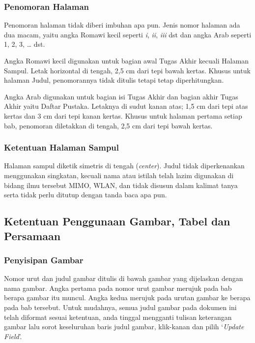 \documentclass{thesis}
\begin{document}
\subsubsection{Penomoran Halaman}

Penomoran halaman tidak diberi imbuhan apa pun. Jenis nomor halaman ada dua macam, yaitu angka Romawi kecil seperti \textit{i}, \textit{ii}, \textit{iii} dst dan angka Arab seperti 1, 2, 3, … dst.

Angka Romawi kecil digunakan untuk bagian awal Tugas Akhir kecuali Halaman Sampul. Letak horizontal di tengah, 2,5 cm dari tepi bawah kertas. Khusus untuk halaman Judul, penomorannya tidak ditulis tetapi tetap diperhitungkan. 

Angka Arab digunakan untuk bagian isi Tugas Akhir dan bagian akhir Tugas Akhir yaitu Daftar Pustaka. Letaknya di sudut kanan atas; 1,5 cm dari tepi atas kertas dan 3 cm dari tepi kanan kertas. Khusus untuk halaman pertama setiap bab, penomoran diletakkan di tengah, 2,5 cm dari tepi bawah kertas. 

\subsubsection{Ketentuan Halaman Sampul}

Halaman sampul diketik simetris di tengah (\textit{center}). Judul tidak diperkenankan menggunakan singkatan, kecuali nama atau istilah telah lazim digunakan di bidang ilmu tersebut MIMO, WLAN,  dan tidak disusun dalam kalimat tanya serta tidak perlu ditutup dengan tanda baca apa pun. 

\subsection{Ketentuan Penggunaan Gambar, Tabel dan Persamaan}

\subsubsection{Penyisipan Gambar}

Nomor urut dan judul gambar ditulis di bawah gambar yang dijelaskan dengan nama gambar. Angka pertama pada nomor urut gambar merujuk pada bab berapa gambar itu muncul. Angka kedua merujuk pada urutan gambar ke berapa pada bab tersebut. Untuk mudahnya, semua judul gambar pada dokumen ini telah diformat sesuai ketentuan, anda tinggal mengganti tulisan keterangan gambar lalu sorot keseluruhan baris judul gambar, klik-kanan dan pilih ‘\textit{Update Field}’.
\end{document}
